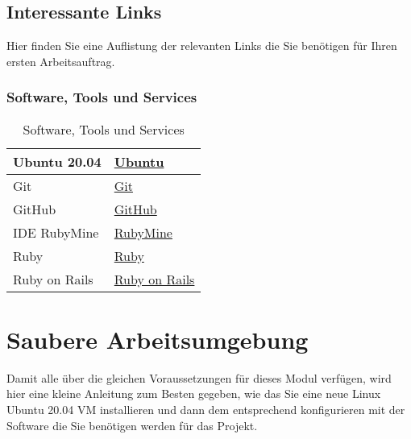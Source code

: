 \subsection{Interessante Links}\label{subsec:links}
\begin{frame}[fragile]
    Hier finden Sie eine Auflistung der relevanten Links die Sie benötigen für Ihren ersten Arbeitsauftrag.
\end{frame}

\begin{frame}[fragile]
    \frametitle<presentation>{Software, Tools und Services}
    \begin{table}[h!]
        \centering
        \begin{tabularx}{0.8\textwidth} {
        | >{\raggedright\arraybackslash}X
        | >{\raggedright\arraybackslash}X | }
            \hline
            Ubuntu 20.04               & \href{https://ubuntu.com/}{Ubuntu}                              \\
            \hline
            Git                        & \href{https://git-scm.com/}{Git}                                \\
            \hline
            GitHub                     & \href{https://github.com/}{GitHub}                              \\
            \hline
            IDE RubyMine               & \href{https://www.jetbrains.com/de-de/ruby/}{RubyMine}          \\
            \hline
            Ruby                       & \href{https://www.ruby-lang.org/de/}{Ruby}                      \\
            \hline
            Ruby on Rails              & \href{https://guides.rubyonrails.org/index.html}{Ruby on Rails} \\
            \hline
        \end{tabularx}
        \caption{Software, Tools und Services}
        \label{tab:2}
    \end{table}
\end{frame}


\section{Saubere Arbeitsumgebung}\label{sec:sauber}
\begin{frame}[fragile]
    Damit alle über die gleichen Voraussetzungen für dieses Modul verfügen, wird hier eine kleine Anleitung zum
    Besten gegeben, wie das Sie eine neue Linux Ubuntu 20.04 VM installieren und dann dem entsprechend konfigurieren
    mit der Software die Sie benötigen werden für das Projekt.
\end{frame}

